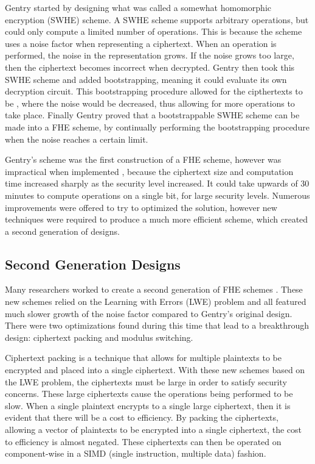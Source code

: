 Gentry started by designing what was called a somewhat homomorphic encryption (SWHE) scheme. A SWHE scheme supports arbitrary operations, but could only compute a limited number of operations. This is because the scheme uses a noise factor when representing a ciphertext. When an operation is performed, the noise in the representation grows. If the noise grows too large, then the ciphertext becomes incorrect when decrypted. Gentry then took this SWHE scheme and added bootstrapping, meaning it could evaluate its own decryption circuit. This bootstrapping procedure allowed for the cipthertexts to be , where the noise would be decreased, thus allowing for more operations to take place. Finally Gentry proved that a bootstrappable SWHE scheme can be made into a FHE scheme, by continually performing the bootstrapping procedure when the noise reaches a certain limit.

Gentry's scheme was the first construction of a FHE scheme, however was impractical when implemented \cite{cryptoeprint:2010:520}, because the ciphertext size and computation time increased sharply as the security level increased. It could take upwards of 30 minutes to compute operations on a single bit, for large security levels. Numerous improvements \cite{cryptoeprint:2010:299,smart2010fully,cryptoeprint:2011:133, cryptoeprint:2011:279} were offered to try to optimized the solution, however new techniques were required to produce a much more efficient scheme, which created a second generation of designs.

\subsection{Second Generation Designs}
Many researchers worked to create a second generation of FHE schemes \cite{cryptoeprint:2011:344, cryptoeprint:2012:078, cryptoeprint:2013:094, cryptoeprint:2013:340}. These new schemes relied on the Learning with Errors (LWE) problem and all featured much slower growth of the noise factor compared to Gentry's original design. There were two optimizations found during this time that lead to a breakthrough design: ciphertext packing and modulus switching. 

Ciphertext packing \cite{brakerski2013packed} is a technique that allows for multiple plaintexts to be encrypted and placed into a single ciphertext. With these new schemes based on the LWE problem, the ciphertexts must be large in order to satisfy security concerns. These large ciphertexts cause the operations being performed to be slow. When a single plaintext encrypts to a single large ciphertext, then it is evident that there will be a cost to efficiency. By packing the ciphertexts, allowing a vector of plaintexts to be encrypted into a single ciphertext, the cost to efficiency is almost negated. These ciphertexts can then be operated on component-wise in a SIMD (single instruction, multiple data) fashion. 

